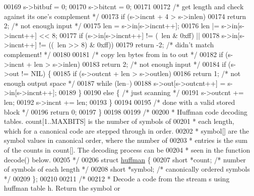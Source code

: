 \begin{DoxyCode}
00169     s->bitbuf = 0;
00170     s->bitcnt = 0;
00171 
00172     \textcolor{comment}{/* get length and check against its one's complement */}
00173     \textcolor{keywordflow}{if} (s->incnt + 4 > s->inlen)
00174         \textcolor{keywordflow}{return} 2;                               \textcolor{comment}{/* not enough input */}
00175     len = s->in[s->incnt++];
00176     len |= s->in[s->incnt++] << 8;
00177     \textcolor{keywordflow}{if} (s->in[s->incnt++] != (~len & 0xff) ||
00178         s->in[s->incnt++] != ((~len >> 8) & 0xff))
00179         \textcolor{keywordflow}{return} -2;                              \textcolor{comment}{/* didn't match complement! */}
00180 
00181     \textcolor{comment}{/* copy len bytes from in to out */}
00182     \textcolor{keywordflow}{if} (s->incnt + len > s->inlen)
00183         \textcolor{keywordflow}{return} 2;                               \textcolor{comment}{/* not enough input */}
00184     \textcolor{keywordflow}{if} (s->out != NIL) \{
00185         \textcolor{keywordflow}{if} (s->outcnt + len > s->outlen)
00186             \textcolor{keywordflow}{return} 1;                           \textcolor{comment}{/* not enough output space */}
00187         \textcolor{keywordflow}{while} (len--)
00188             s->out[s->outcnt++] = s->in[s->incnt++];
00189     \}
00190     \textcolor{keywordflow}{else} \{                                      \textcolor{comment}{/* just scanning */}
00191         s->outcnt += len;
00192         s->incnt += len;
00193     \}
00194 
00195     \textcolor{comment}{/* done with a valid stored block */}
00196     \textcolor{keywordflow}{return} 0;
00197 \}
00198 
00199 \textcolor{comment}{/*}
00200 \textcolor{comment}{ * Huffman code decoding tables.  count[1..MAXBITS] is the number of symbols of}
00201 \textcolor{comment}{ * each length, which for a canonical code are stepped through in order.}
00202 \textcolor{comment}{ * symbol[] are the symbol values in canonical order, where the number of}
00203 \textcolor{comment}{ * entries is the sum of the counts in count[].  The decoding process can be}
00204 \textcolor{comment}{ * seen in the function decode() below.}
00205 \textcolor{comment}{ */}
00206 \textcolor{keyword}{struct }\hyperlink{structhuffman}{huffman} \{
00207     \textcolor{keywordtype}{short} *count;       \textcolor{comment}{/* number of symbols of each length */}
00208     \textcolor{keywordtype}{short} *symbol;      \textcolor{comment}{/* canonically ordered symbols */}
00209 \};
00210 
00211 \textcolor{comment}{/*}
00212 \textcolor{comment}{ * Decode a code from the stream s using huffman table h.  Return the symbol or}

\end{DoxyCode}

